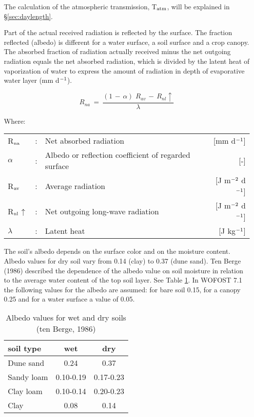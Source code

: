The calculation of the atmospheric transmission, T$_{{\rm atm}}$, will be explained in 
\S \ref{sec:daylength}.

Part of the actual received radiation is reflected by the surface. The fraction reflected
(albedo) is different for a water surface, a soil surface and a crop canopy. The absorbed
fraction of radiation actually received minus the net outgoing radiation equals the net
absorbed radiation, which is divided by the latent heat of vaporization of water to express
the amount of radiation in depth of evaporative water layer (mm d$^{{\rm -1}}$).

\begin{equation}
\label{eq:AbsGlobRad}
R _{na} ~=~{\frac{(1\, -\, \alpha )\,\, R _{av} \, -\, R _{nl} \uparrow  }{\lambda}}
\end{equation}


Where:\\[5pt]
\begin{tabularx}{\textwidth}{llXr}
	R$_{{\rm na}}$ &:& Net absorbed radiation  & [mm d$^{{\rm -1}}$]\\
	$\alpha$ &:& Albedo or reflection coefficient of regarded surface  & [-]\\
	R$_{{\rm av}}$ &:& Average radiation  & [J m$^{{\rm -2}}$ d$^{{\rm -1}}$]\\
	R$_{{\rm nl}}$$\uparrow$ &:& Net outgoing long-wave radiation  & [J m$^{{\rm -2}}$ d$^{{\rm -1}}$]\\
	$\lambda$ &:& Latent heat  & [J kg$^{{\rm -1}}$]\\
\end{tabularx}


The soil's albedo depends on the surface color and on the moisture content. Albedo
values for dry soil vary from 0.14 (clay) to 0.37 (dune sand). Ten Berge (1986) described
the depen\-dence of the albedo value on soil moisture in relation to the average water
content of the top soil layer. See Table \ref{tab:AlbedoSoils}. 
In WOFOST 7.1 the following values for the albedo are assumed: for bare soil
0.15, for a canopy  0.25 and for a water surface a value of 0.05.

\begin{table}
	\centering
	\caption{Albedo values for wet and dry soils (ten Berge, 1986)}
	\label{tab:AlbedoSoils}
	\begin{tabular}{lcc}
		\hline
		soil type & wet & dry\\
		\hline
		Dune sand  &   0.24 &  0.37 \\
		Sandy loam &    0.10-0.19 &  0.17-0.23\\
		Clay loam &    0.10-0.14 &  0.20-0.23\\
		Clay &    0.08 &  0.14\\
		\hline
	\end{tabular}
\end{table}

